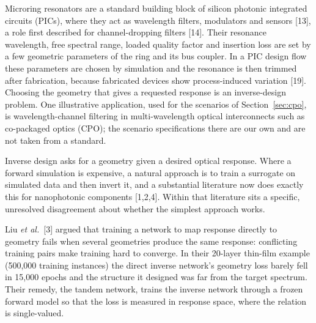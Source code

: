 \documentclass[11pt]{article}
\begin{document}
Microring resonators are a standard building block of silicon photonic integrated circuits (PICs), where they act as wavelength filters, modulators and sensors [13], a role first described for channel-dropping filters [14]. Their resonance wavelength, free spectral range, loaded quality factor and insertion loss are set by a few geometric parameters of the ring and its bus coupler. In a PIC design flow these parameters are chosen by simulation and the resonance is then trimmed after fabrication, because fabricated devices show process-induced variation [19]. Choosing the geometry that gives a requested response is an inverse-design problem. One illustrative application, used for the scenarios of Section~\ref{sec:cpo}, is wavelength-channel filtering in multi-wavelength optical interconnects such as co-packaged optics (CPO); the scenario specifications there are our own and are not taken from a standard.


Inverse design asks for a geometry given a desired optical response. Where a
forward simulation is expensive, a natural approach is to train a surrogate on
simulated data and then invert it, and a substantial literature now does
exactly this for nanophotonic components [1,2,4]. Within that literature sits a
specific, unresolved disagreement about whether the simplest approach works.

Liu \emph{et al.}\ [3] argued that training a network to map response
directly to geometry fails when several geometries produce the same response:
conflicting training pairs make training hard to converge. In their 20-layer
thin-film example (500{,}000 training instances) the direct inverse network's
geometry loss barely fell in 15{,}000 epochs and the structure it designed was
far from the target spectrum. Their remedy, the tandem network, trains the
inverse network through a frozen forward model so that the loss is measured in
response space, where the relation is single-valued.
\end{document}
